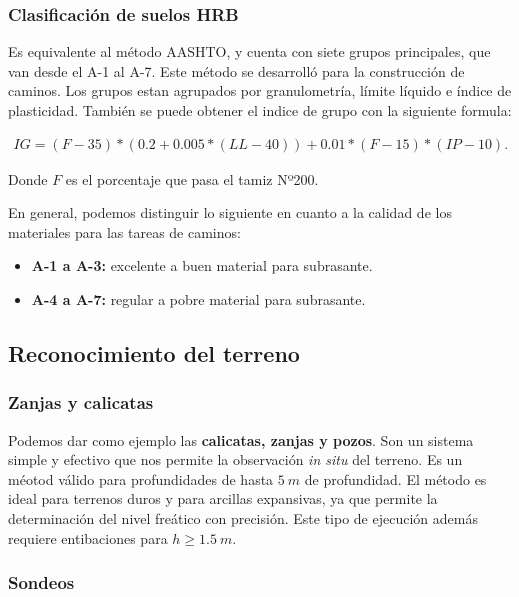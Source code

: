 \documentclass[../main.tex]{subfiles}
\begin{document}
\subsubsection{Clasificación de suelos HRB}

Es equivalente al método AASHTO, y cuenta con siete grupos principales, que van
desde el A-1 al A-7. Este método se desarrolló para la construcción de caminos.
Los grupos estan agrupados por granulometría, límite líquido e índice de plasticidad.
También se puede obtener el indice de grupo con la siguiente formula:

\begin{align*}
  IG = (F-35)*(0.2 + 0.005 * (LL - 40)) + 0.01 * (F - 15) * (IP - 10)
.\end{align*}

Donde $F$ es el porcentaje que pasa el tamiz Nº200.

En general, podemos distinguir lo siguiente en cuanto a la calidad de los materiales
para las tareas de caminos:

\begin{itemize}
  \item \textbf{A-1 a A-3:} excelente a buen material para subrasante.
  \item \textbf{A-4 a A-7:} regular a pobre material para subrasante.
\end{itemize}

\subsection{Reconocimiento del terreno}

\subsubsection{Zanjas y calicatas}


Podemos dar como ejemplo las \textbf{calicatas, zanjas y pozos}. Son un sistema
simple y efectivo que nos permite la observación \textit{in situ} del terreno.
Es un méotod válido para profundidades de hasta $\SI{5}{m}$ de profundidad. El
método es ideal para terrenos duros y para arcillas expansivas, ya que permite
la determinación del nivel freático con precisión.
Este tipo de ejecución además requiere entibaciones para $h \geq \SI{1.5}{m}$.

\subsubsection{Sondeos}
\end{document}

